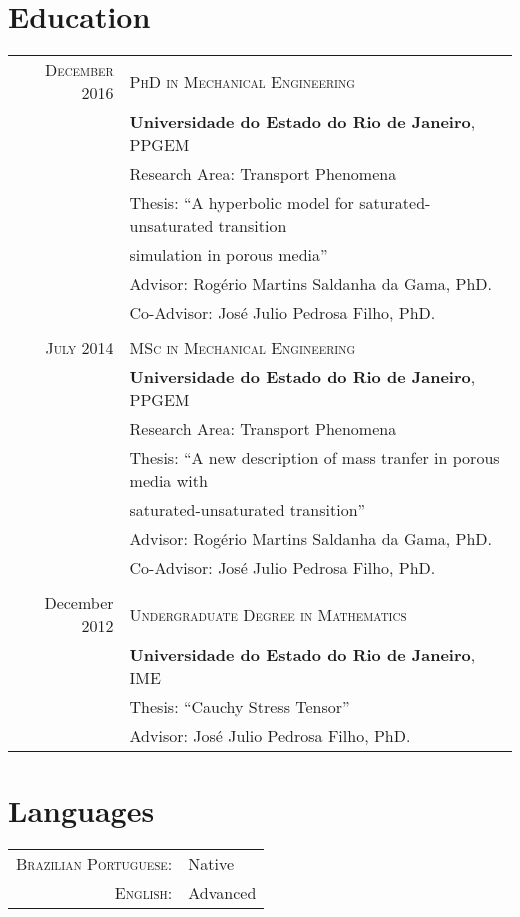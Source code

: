 \documentclass[a4paper,10pt]{article}
\begin{document}
\section{Education}
\begin{tabular}{rl}

\textsc{December} 2016 & \textsc{PhD in Mechanical Engineering}\\&
\textbf{Universidade do Estado do Rio de Janeiro}, \textsc{PPGEM}\\&
Research Area: Transport Phenomena\\&
Thesis: “A hyperbolic model for saturated-unsaturated transition\\& simulation in porous media”\\&
Advisor: Rogério Martins Saldanha da Gama, PhD.\\&
Co-Advisor: José Julio Pedrosa Filho, PhD.\\
\\
\textsc{July 2014} & \textsc{MSc in Mechanical Engineering}\\&
\textbf{Universidade do Estado do Rio de Janeiro}, \textsc{PPGEM}\\&
Research Area: Transport Phenomena\\&
Thesis: “A new description of mass tranfer in porous media with\\&
saturated-unsaturated transition”\\&
Advisor: Rogério Martins Saldanha da Gama, PhD.\\&
Co-Advisor: José Julio Pedrosa Filho, PhD.\\
\\
December 2012 & \textsc{Undergraduate Degree in Mathematics}\\&
\textbf{Universidade do Estado do Rio de Janeiro}, \textsc{IME}\\&
Thesis: “Cauchy Stress Tensor”\\&
Advisor: José Julio Pedrosa Filho, PhD.\\

\end{tabular}

\section{Languages}
\begin{tabular}{rl}
\textsc{Brazilian Portuguese:}&Native\\
\textsc{English:}&Advanced\\
\end{tabular}


\end{document}
